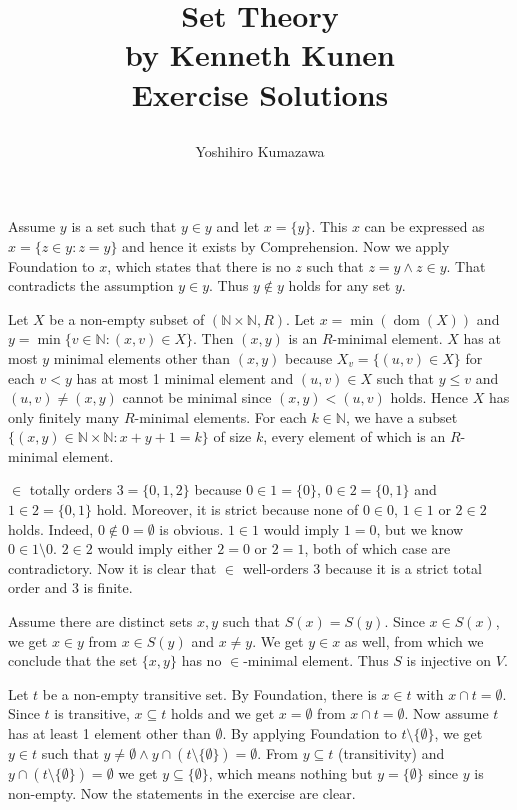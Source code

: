 \documentclass[12pt]{article}
\title{
  \vspace{-2cm}
  Set Theory \\
  \large by Kenneth Kunen \\
  Exercise Solutions
  \author{Yoshihiro Kumazawa}
}
\newcommand{\dom}{\mathop{\mathrm{dom}}}
\theoremstyle{definition}
\newenvironment{customthm}[1]
  {\renewcommand\theinnercustomthm{#1}\innercustomthm}
  {\endinnercustomthm}
\begin{document}
\maketitle

\begin{customthm}{I.4.18}
  Assume $y$ is a set such that $y\in y$ and let $x=\{y\}$. This $x$ can be expressed as $x=\{z\in y:z=y\}$ and hence it exists by Comprehension. Now we apply Foundation to $x$, which states that there is no $z$ such that $z=y\wedge z\in y$. That contradicts the assumption $y\in y$. Thus $y\notin y$ holds for any set $y$.
\end{customthm}

\begin{customthm}{I.6.23}
  Let $X$ be a non-empty subset of $(\mathbb{N}\times\mathbb{N},R)$. Let $x=\min(\dom(X))$ and $y=\min\{v\in\mathbb{N}:(x,v)\in X\}$. Then $(x,y)$ is an $R$-minimal element. $X$ has at most $y$ minimal elements other than $(x,y)$ because $X_v=\{(u,v)\in X\}$ for each $v<y$ has at most 1 minimal element and $(u,v)\in X$ such that $y\leq v$ and $(u,v)\neq(x,y)$ cannot be minimal since $(x,y)<(u,v)$ holds. Hence $X$ has only finitely many $R$-minimal elements. For each $k\in\mathbb{N}$, we have a subset $\{(x,y)\in\mathbb{N}\times\mathbb{N}:x+y+1=k\}$ of size $k$, every element of which is an $R$-minimal element.
\end{customthm}

\begin{customthm}{I.6.26}
  $\in$ totally orders $3=\{0,1,2\}$ because $0\in 1=\{0\}$, $0\in 2=\{0,1\}$ and $1\in 2=\{0,1\}$ hold. Moreover, it is strict because none of $0\in 0$, $1\in 1$ or $2\in 2$ holds. Indeed, $0\notin 0=\emptyset$ is obvious. $1\in 1$ would imply $1=0$, but we know $0\in 1\setminus0$. $2\in 2$ would imply either $2=0$ or $2=1$, both of which case are contradictory. Now it is clear that $\in$ well-orders $3$ because it is a strict total order and $3$ is finite.
\end{customthm}

\begin{customthm}{I.6.29}
  Assume there are distinct sets $x,y$ such that $S(x)=S(y)$. Since $x\in S(x)$, we get $x\in y$ from $x\in S(y)$ and $x\neq y$. We get $y\in x$ as well, from which we conclude that the set $\{x,y\}$ has no $\in$-minimal element. Thus $S$ is injective on $V$.
\end{customthm}

\begin{customthm}{I.7.2}
  Let $t$ be a non-empty transitive set. By Foundation, there is $x\in t$ with $x\cap t=\emptyset$. Since $t$ is transitive, $x\subseteq t$ holds and we get $x=\emptyset$ from $x\cap t=\emptyset$. Now assume $t$ has at least 1 element other than $\emptyset$. By applying Foundation to $t\setminus\{\emptyset\}$, we get $y\in t$ such that $y\neq\emptyset\wedge y\cap(t\setminus\{\emptyset\})=\emptyset$. From $y\subseteq t$ (transitivity) and $y\cap(t\setminus\{\emptyset\})=\emptyset$ we get $y\subseteq\{\emptyset\}$, which means nothing but $y=\{\emptyset\}$ since $y$ is non-empty. Now the statements in the exercise are clear.
\end{customthm}
\end{document}
